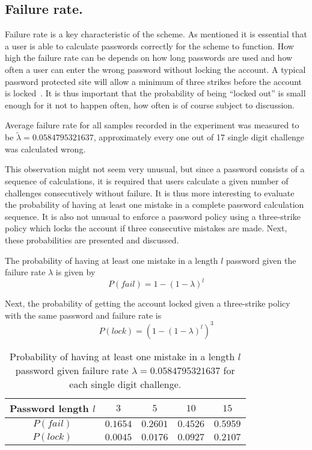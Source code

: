 \subsection{Failure rate.}
Failure rate is a key characteristic of the scheme. As mentioned it is essential that a user is able to calculate passwords correctly for the scheme to function. How high the failure rate can be depends on how long passwords are used and how often a user can enter the wrong password without locking the account. A typical password protected site will allow a minimum of three strikes before the account is locked~\cite{10-strikes}. It is thus important that the probability of being ``locked out'' is small enough for it not to happen often, how often is of course subject to discussion.

\begin{observation}\label{obs:failrate}
    Average failure rate for all samples recorded in the experiment was measured to be $\tilde \lambda = 0.0584795321637$, approximately every one out of 17 single digit challenge was calculated wrong.
\end{observation}
This observation might not seem very unusual, but since a password consists of a sequence of calculations, it is required that users calculate a given number of challenges consecutively without failure. It is thus more interesting to evaluate the probability of having at least one mistake in a complete password calculation sequence. It is also not unusual to enforce a password policy using a three-strike policy which locks the account if three consecutive mistakes are made. Next, these probabilities are presented and discussed. 


The probability of having at least one mistake in a length $l$ password given the failure rate $\lambda$ is given by
\begin{equation}\label{eq:failrate}
    P(fail) = 1 - (1 - \lambda)^l
\end{equation}

Next, the probability of getting the account locked given a three-strike policy with the same password and failure rate is 
\begin{equation}\label{eq:lockrate}
    P(lock) = ( 1 - (1 - \lambda)^l )^3
\end{equation}


\begin{table}[h]
    \centering
\begin{tabular}{|c|c|c|c|c|}
    \hline
    Password length $l$ & $3$ & $5$ & $10$ & $15$ \\ \hline \hline
    $P(fail)$ & $0.1654$ & $0.2601$ & $0.4526$ & $0.5959$ \\ \hline
    $P(lock)$ & $0.0045$ & $0.0176$ & $0.0927$ & $0.2107$ \\ \hline
\end{tabular}
\caption{Probability of having at least one mistake in a length $l$ password given failure rate $\lambda = 0.0584795321637$ for each single digit challenge.}
\label{tbl:failrate}
\end{table}
 
